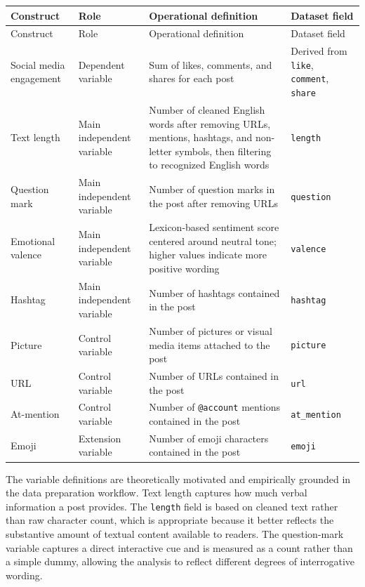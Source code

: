 \documentclass[12pt,a4paper]{ctexart}
\begin{document}
\begin{longtable}{p{} p{} p{} p{}}
\toprule
Construct & Role & Operational definition & Dataset field \\
\midrule
\endfirsthead
\toprule
Construct & Role & Operational definition & Dataset field \\
\midrule
\endhead
Social media engagement & Dependent variable & Sum of likes, comments, and shares for each post & Derived from \texttt{like}, \texttt{comment}, \texttt{share} \\
Text length & Main independent variable & Number of cleaned English words after removing URLs, mentions, hashtags, and non-letter symbols, then filtering to recognized English words & \texttt{length} \\
Question mark & Main independent variable & Number of question marks in the post after removing URLs & \texttt{question} \\
Emotional valence & Main independent variable & Lexicon-based sentiment score centered around neutral tone; higher values indicate more positive wording & \texttt{valence} \\
Hashtag & Main independent variable & Number of hashtags contained in the post & \texttt{hashtag} \\
Picture & Control variable & Number of pictures or visual media items attached to the post & \texttt{picture} \\
URL & Control variable & Number of URLs contained in the post & \texttt{url} \\
At-mention & Control variable & Number of \texttt{@account} mentions contained in the post & \texttt{at\_mention} \\
Emoji & Extension variable & Number of emoji characters contained in the post & \texttt{emoji} \\
\bottomrule
\end{longtable}

The variable definitions are theoretically motivated and empirically grounded in the data preparation workflow. Text length captures how much verbal information a post provides. The \texttt{length} field is based on cleaned text rather than raw character count, which is appropriate because it better reflects the substantive amount of textual content available to readers. The question-mark variable captures a direct interactive cue and is measured as a count rather than a simple dummy, allowing the analysis to reflect different degrees of interrogative wording.
\end{document}
